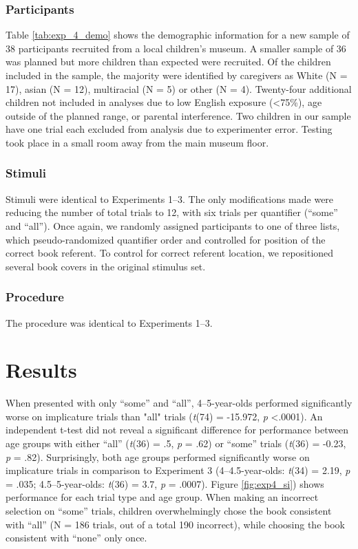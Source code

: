 \documentclass[man]{apa2}
\begin{document}
\subsubsection{Participants}

Table \ref{tab:exp_4_demo} shows the demographic information for a new sample of 38 participants recruited from a local children's museum. A smaller sample of 36 was planned but more children than expected were recruited. Of the children included in the sample, the majority were identified by caregivers as White (N = 17), asian (N = 12), multiracial (N = 5) or other (N = 4). Twenty-four additional children not included in analyses due to low English exposure (\textless 75\%), age outside of the planned range, or parental interference. Two children in our sample have one trial each excluded from analysis due to experimenter error. Testing took place in a small room away from the main museum floor.

\subsubsection{Stimuli}

Stimuli were identical to Experiments 1--3. The only modifications made were reducing the number of total trials to 12, with six trials per quantifier (``some'' and ``all''). Once again, we randomly assigned participants to one of three lists, which pseudo-randomized quantifier order and controlled for position of the correct book referent. To control for correct referent location, we repositioned several book covers in the original stimulus set.

\subsubsection{Procedure}

The procedure was identical to Experiments 1--3.

\section{Results}

When presented with only ``some'' and ``all'', 4--5-year-olds performed significantly worse on implicature trials than "all" trials (\emph{t}(74) = -15.972, \emph{p} \textless .0001). An independent t-test did not reveal a significant difference for performance between age groups with either ``all'' (\emph{t}(36) = .5, \emph{p} = .62) or ``some'' trials (\emph{t}(36) = -0.23, \emph{p} = .82). Surprisingly, both age groups performed significantly worse on implicature trials in comparison to Experiment 3 (4--4.5-year-olds: \emph{t}(34) = 2.19, \emph{p} = .035; 4.5--5-year-olds: \emph{t}(36) = 3.7, \emph{p} = .0007). Figure \ref{fig:exp4_si}) shows performance for each trial type and age group. When making an incorrect selection on ``some'' trials, children overwhelmingly chose the book consistent with ``all'' (N = 186 trials, out of a total 190 incorrect), while choosing the book consistent with ``none'' only once.
\end{document}
